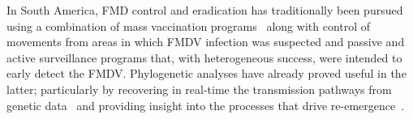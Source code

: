 \documentclass[10pt]{article}
\begin{document}

In South America, FMD control and eradication has traditionally been pursued using a combination of mass vaccination programs~\cite{vaccinationSA} along with control of movements from areas in which FMDV infection was suspected and passive and active surveillance programs that, with heterogeneous success, were intended to early detect the FMDV.
Phylogenetic analyses have already proved useful in the latter; particularly by recovering in real-time the transmission pathways from genetic data~\cite{cottam2007,cottam2008} and providing insight into the processes that drive re-emergence~\cite{combining}.
\end{document}
